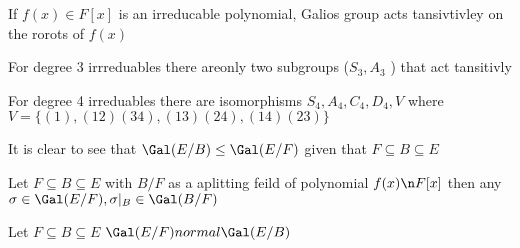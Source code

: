 
If \(f(x) \in F[x]\) is an irreducable polynomial, Galios group acts tansivtivley on the rorots of \(f(x)\)

\begin{example}
    For degree 3 irrreduables there areonly two subgroups (\(S_3, A_3\) ) that act tansitivly
\end{example}

\begin{example}
    For degree 4 irreduables there are isomorphisms \(S_4, A_4, C_4, D_4, V\) where \(V = \{(1), (12)(34), (13)(24), (14)(23)\}\)  
\end{example}


It is clear to see that \(\Gal (E/B) \leq \Gal(E/F)\) given that \(F \subseteq B\subseteq E\)

\begin{lemma}
    Let \(F \subseteq B\subseteq E\) with \(B/F\) as a aplitting feild of polynomial \(f(x) \n F[x]\) then any \(\sigma \in \Gal(E/F), \sigma |_B \in \Gal(B/F)\)   
\end{lemma}
 
\begin{theorem}
    Let \(F \subseteq B\subseteq E\) \(\Gal(E/F) normal \Gal(E/B)\) 
\end{theorem}


